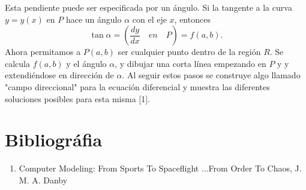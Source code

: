 \documentclass[12pt]{article}
\begin{document}
Esta pendiente puede ser especificada por un ángulo. Si la tangente a la curva $y=y(x)$ en $P$ hace un ángulo $\alpha$ con el eje $x$, entonces
\begin{equation}
	\tan \alpha = \left(\dfrac{dy}{dx} \quad en \quad P \right) = f(a,b).
\end{equation}
Ahora permitamos a $P(a,b)$ ser cualquier punto dentro de la región $R$. Se calcula $f(a,b)$ y el ángulo $\alpha$, y dibujar una corta línea empezando en $P$ y y extendiéndose en dirección de $\alpha$. Al seguir estos pasos se construye algo llamado "campo direccional" para la ecuación diferencial y muestra las diferentes soluciones posibles para esta misma [1].
\section*{Bibliográfia}
\begin{enumerate}
	\item Computer Modeling: From Sports To Spaceflight ...From Order To Chaos, J. M. A. Danby
\end{enumerate}
\end{document}
